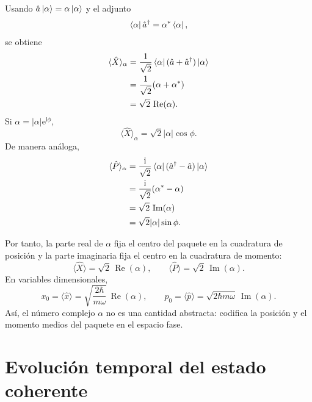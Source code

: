 \documentclass[11pt]{article}
\newcommand{\ii}{\mathrm{i}}
\newcommand{\ee}{\mathrm{e}}
\newcommand{\adag}{\hat a^\dagger}
\newcommand{\Real}{\operatorname{Re}}
\newcommand{\Imag}{\operatorname{Im}}
\begin{document}
Usando $\hat a\ket{\alpha}=\alpha\ket{\alpha}$ y el adjunto
\begin{equation}
  \bra{\alpha}\adag=\alpha^*\bra{\alpha},
\end{equation}
se obtiene
\begin{align}
  \langle\hat X\rangle_\alpha
  &=\frac{1}{\sqrt2}
    \bra{\alpha}(\hat a+\adag)\ket{\alpha}\\
  &=\frac{1}{\sqrt2}(\alpha+\alpha^*)\\
  &=\sqrt2\,\Real(\alpha).
\end{align}
Si $\alpha=|\alpha|\ee^{\ii\phi}$,
\begin{equation}
  \langle\hat X\rangle_\alpha
  =\sqrt2|\alpha|\cos\phi.
\end{equation}
De manera an\'aloga,
\begin{align}
  \langle\hat P\rangle_\alpha
  &=\frac{\ii}{\sqrt2}
    \bra{\alpha}(\adag-\hat a)\ket{\alpha}\\
  &=\frac{\ii}{\sqrt2}(\alpha^*-\alpha)\\
  &=\sqrt2\,\Imag(\alpha)\\
  &=\sqrt2|\alpha|\sin\phi.
\end{align}

Por tanto, la parte real de $\alpha$ fija el centro del paquete en la
cuadratura de posici\'on y la parte imaginaria fija el centro en la cuadratura
de momento:
\begin{equation}
  \boxed{
  \langle\hat X\rangle=\sqrt2\,\Real(\alpha),
  \qquad
  \langle\hat P\rangle=\sqrt2\,\Imag(\alpha).
  }
\end{equation}
En variables dimensionales,
\begin{equation}
  x_0=\langle\hat x\rangle
  =\sqrt{\frac{2\hbar}{m\omega}}\,\Real(\alpha),
  \qquad
  p_0=\langle\hat p\rangle
  =\sqrt{2\hbar m\omega}\,\Imag(\alpha).
\end{equation}
As\'i, el n\'umero complejo $\alpha$ no es una cantidad abstracta: codifica la
posici\'on y el momento medios del paquete en el espacio fase.

\section{Evoluci\'on temporal del estado coherente}
\end{document}
